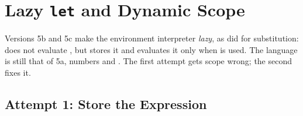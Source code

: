 \section{Lazy \texttt{let} and Dynamic Scope}
\label{sec:dynscope}

Versions 5b and 5c make the environment interpreter \emph{lazy}, as  did for substitution:  does not evaluate , but stores it and evaluates it only when  is used. The language is still that of 5a, numbers and . The first attempt gets scope wrong; the second fixes it.

\subsection{Attempt 1: Store the Expression}

